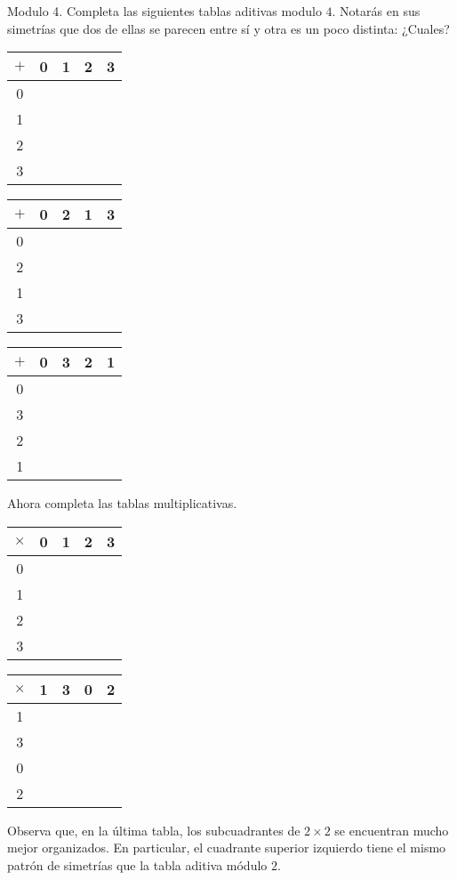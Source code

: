 \begin{ejercicio}
Modulo 4. Completa las siguientes tablas aditivas modulo $4$. Notarás en sus simetrías que dos de ellas se parecen entre sí y otra es un poco distinta: ¿Cuales?

\begin{tabular}{|c||c|c|c|c|} 
 \hline
  $\plus$ & 0 & 1 & 2 & 3\\ 
  \hline
  \hline
  0 &  & & & \\ 
  \hline
  1 &  & & &\\
    \hline
  2 &  & & & \\
      \hline
  3 &  & & & \\ 
  \hline
\end{tabular}
\hspace{.5cm}
\begin{tabular}{|c||c|c|c|c|} 
 \hline
  $\plus$ & 0 & 2 & 1 & 3\\ 
  \hline
  \hline
  0 &  & & & \\ 
  \hline
  2 &  & & &\\
    \hline
  1 &  & & & \\
      \hline
  3 &  & & & \\ 
  \hline
\end{tabular}
\hspace{.5cm}
\begin{tabular}{|c||c|c|c|c|} 
 \hline
  $\plus$ & 0 & 3 & 2 & 1\\ 
  \hline
  \hline
  0 &  & & & \\ 
  \hline
  3 &  & & &\\
    \hline
  2 &  & & & \\
      \hline
  1 &  & & & \\ 
  \hline
\end{tabular}

Ahora completa las tablas multiplicativas.

\begin{tabular}{|c||c|c|c|c|} 
 \hline
  $\times$ & 0 & 1 & 2 & 3\\ 
  \hline
  \hline
  0 &  & & & \\ 
  \hline
  1 &  & & &\\
    \hline
  2 &  & & & \\
      \hline
  3 &  & & & \\ 
  \hline
\end{tabular}
\hspace{.5cm}
\begin{tabular}{|c||c|c|c|c|} 
 \hline
  $\times$ & 1 & 3 & 0 & 2\\ 
  \hline
  \hline
  1 &  & & & \\ 
  \hline
  3 &  & & &\\
    \hline
  0 &  & & & \\
      \hline
  2 &  & & & \\ 
  \hline
\end{tabular}

Observa que, en la última tabla, los subcuadrantes de $2\times 2$ se encuentran mucho mejor organizados. En particular, el cuadrante superior izquierdo tiene el mismo patrón de simetrías que la tabla aditiva módulo $2$.
\end{ejercicio}

